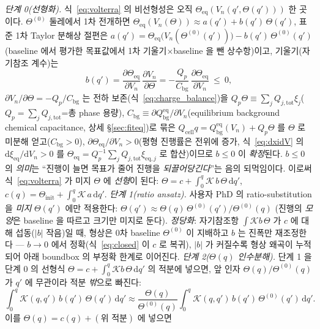 \documentclass[11pt,a4paper]{article}
\newcommand{\dd}{\mathrm{d}}
\newcommand{\eq}{\mathrm{eq}}
\newcommand{\bg}{\mathrm{bg}}
\newcommand{\cell}{\mathrm{cell}}
\newcommand{\tot}{\mathrm{tot}}
\begin{document}
\emph{단계 0(선형화).} 식~\eqref{eq:volterra} 의 비선형성은 오직 $\Theta_\eq(V_n(q',\Theta(q')))$ 한 곳이다.
$\Theta^{(0)}$ 둘레에서 1차 전개하면 $\Theta_\eq(V_n(\Theta))\approx a(q')+b(q')\,\Theta(q')$, 표준 1차 Taylor
분해상 절편은 $a(q')=\Theta_\eq\big(V_n(\Theta^{(0)}(q'))\big)-b(q')\,\Theta^{(0)}(q')$(baseline 에서 평가한 목표값에서
1차 기울기$\times$baseline 을 뺀 상수항)이고, 기울기(자기참조 계수)는
\begin{equation}
b(q')=\frac{\partial\Theta_\eq}{\partial V_n}\,\frac{\partial V_n}{\partial\Theta}
=-\frac{Q_p}{C_\bg}\,\frac{\partial\Theta_\eq}{\partial V_n}\ \le\ 0,
\label{eq:selfcoupling}
\end{equation}
$\partial V_n/\partial\Theta=-Q_p/C_\bg$ 는 전하 보존(식~\eqref{eq:charge_balance})을 $Q_p\Theta\equiv\sum_j
Q_{j,\tot}\xi_j$($Q_p=\sum_j Q_{j,\tot}$=총 phase 용량), $C_\bg\equiv\partial Q_\bg^{\eq}/\partial V_n$(equilibrium background chemical
capacitance, 상세 \S\ref{sec:fiteq})로 묶은 $Q_\cell q=Q_\bg^{\eq}(V_n)+Q_p\Theta$ 를 $\Theta$ 로 미분해 얻고($C_\bg>0$), $\partial\Theta_\eq/\partial V_n>0$(평형 진행률은 전위에 증가, 식~\eqref{eq:dxidV} 의 $\dd\xi_\eq/\dd V_n>0$
를 $\Theta_\eq=Q_p^{-1}\sum_j Q_{j,\tot}\xi_{\eq,j}$ 로 합산)이므로 $b\le0$ 이 \emph{확정}된다. $b\le0$ 의 \emph{의미}는
``진행이 늘면 목표가 줄어 진행을 \emph{되끌어당긴다}''는 음의 되먹임이다.
이로써 식~\eqref{eq:volterra} 가 미지 $\Theta$ 에 \emph{선형}이 된다: $\Theta=c+\int_0^q\mathcal K\,b\,\Theta\,\dd q'$,
$c(q)=\Theta_\mathrm{init}+\int_0^q\mathcal K\,a\,\dd q'$.
\emph{단계 1(ratio ansatz).} 사용자 PhD \cite{lee2011,son2013} 의 ratio-substitution 을 \emph{미지} $\Theta(q')$
에만 적용한다: $\Theta(q')\approx\Theta(q)\,\Theta^{(0)}(q')/\Theta^{(0)}(q)$ (진행의 \emph{모양}은 baseline 을
따르고 크기만 미지로 둔다). \emph{정당화}: 자기참조항 $\int\mathcal K b\,\Theta$ 가 $c$ 에 대해 섭동($|b|$ 작음)일
때, 형상은 0차 baseline $\Theta^{(0)}$ 이 지배하고 $b$ 는 진폭만 재조정한다 — $b\to0$ 에서 정확(식~\eqref{eq:closed}
이 $c$ 로 복귀), $|b|$ 가 커질수록 형상 왜곡이 누적되어 아래 boundbox 의 부정확 한계로 이어진다.
\emph{단계 2($\Theta(q)$ 인수분해).} 단계 1 을 단계 0 의 선형식 $\Theta=c+\int_0^q\mathcal K b\,\Theta\,\dd q'$ 의
적분에 넣으면, 앞 인자 $\Theta(q)/\Theta^{(0)}(q)$ 가 $q'$ 에 무관이라 적분 \emph{밖}으로 빠진다:
\begin{equation*}
\int_0^q\mathcal K(q,q')\,b(q')\,\Theta(q')\,\dd q'\approx\frac{\Theta(q)}{\Theta^{(0)}(q)}\int_0^q\mathcal K(q,q')\,b(q')\,\Theta^{(0)}(q')\,\dd q'.
\end{equation*}
이를 $\Theta(q)=c(q)+(\text{위 적분})$ 에 넣으면
\end{document}
